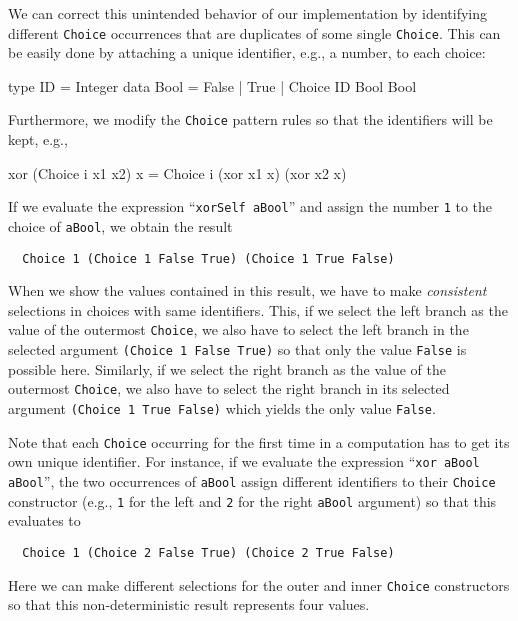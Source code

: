 \documentclass{llncs}
\newcommand{\code}[1]{\mbox{\small\texttt{#1}}}
\newcommand{\ccode}[1]{``\code{#1}''}
\begin{document}
We can correct this unintended behavior of our implementation
by identifying different \code{Choice} occurrences that are duplicates
of some single \code{Choice}. This can be easily done by attaching
a unique identifier, e.g., a number, to each choice:
\begin{haskell}
  type ID = Integer
  data Bool = False | True | Choice ID Bool Bool
\end{haskell}
Furthermore, we modify the \code{Choice} pattern rules so that
the identifiers will be kept, e.g.,
\begin{curry}
  xor (Choice i x1 x2) x = Choice i (xor x1 x) (xor x2 x)
\end{curry}
If we evaluate the expression \ccode{xorSelf aBool} and
assign the number \code{1}
to the choice of \code{aBool}, we obtain the result
\begin{lstlisting}
  Choice 1 (Choice 1 False True) (Choice 1 True False)
\end{lstlisting}
When we show the values contained in this result,
we have to make \emph{consistent} selections in choices with
same identifiers. This, if we select the left branch as the value
of the outermost \code{Choice}, we also have to select the left branch
in the selected argument \code{(Choice 1 False True)} so that only
the value \code{False} is possible here.
Similarly, if we select the right branch as the value of the outermost
\code{Choice}, we also have to select the right branch in
its selected argument \code{(Choice 1 True False)} which yields the only
value \code{False}.

Note that each \code{Choice} occurring for the first time in a computation
has to get its own unique identifier.
For instance, if we evaluate the expression \ccode{xor aBool aBool},
the two occurrences of \code{aBool} assign different identifiers
to their \code{Choice} constructor (e.g., \code{1} for the left
and \code{2} for the right \code{aBool} argument) so that this evaluates to
\begin{lstlisting}
  Choice 1 (Choice 2 False True) (Choice 2 True False)
\end{lstlisting}
Here we can make different selections for the outer and inner
\code{Choice} constructors so that this non-deterministic result represents
four values.
\end{document}
